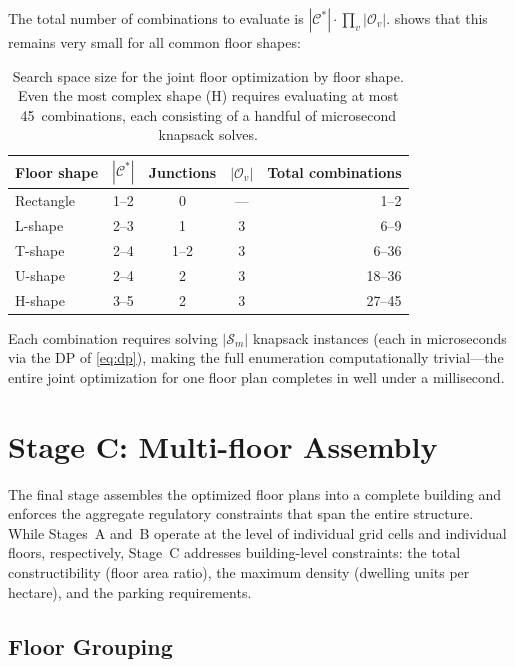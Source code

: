 \documentclass[11pt,a4paper]{article}
\newcommand{\calS}{\mathcal{S}}
\newcommand{\calC}{\mathcal{C}}
\newcommand{\calO}{\mathcal{O}}
\begin{document}
The total number of combinations to evaluate is
$|\calC^*| \cdot \prod_{v} |\calO_v|$.  shows
that this remains very small for all common floor shapes:

\begin{table}[h]
\centering
\begin{tabular}{lcccr}
\toprule
Floor shape & $|\calC^*|$ & Junctions & $|\calO_v|$ & Total combinations \\
\midrule
Rectangle   & 1--2 & 0 & --- & 1--2 \\
L-shape     & 2--3 & 1 & 3   & 6--9 \\
T-shape     & 2--4 & 1--2 & 3 & 6--36 \\
U-shape     & 2--4 & 2 & 3   & 18--36 \\
H-shape     & 3--5 & 2 & 3   & 27--45 \\
\bottomrule
\end{tabular}
\caption{Search space size for the joint floor optimization by floor
shape. Even the most complex shape (H) requires evaluating at most
45~combinations, each consisting of a handful of microsecond knapsack
solves.}
\label{tab:search-space}
\end{table}

Each combination requires solving $|\calS_m|$ knapsack instances (each
in microseconds via the DP of \eqref{eq:dp}), making the full
enumeration computationally trivial---the entire joint optimization
for one floor plan completes in well under a millisecond.


\section{Stage C: Multi-floor Assembly}\label{sec:multifloor}

The final stage assembles the optimized floor plans into a complete
building and enforces the aggregate regulatory constraints that span
the entire structure. While Stages~A and~B operate at the level of
individual grid cells and individual floors, respectively, Stage~C
addresses building-level constraints: the total constructibility
(floor area ratio), the maximum density (dwelling units per hectare),
and the parking requirements.

\subsection{Floor Grouping}
\end{document}
